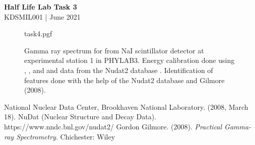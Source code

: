 \documentclass[11pt]{article}
\numberwithin{equation}{section}
\numberwithin{table}{section}
\begin{document}
\begin{center}
    {\textbf{\LARGE Half Life Lab Task 3}}\\
    \vspace{0.2in}
    KDSMIL001 | June 2021
    
\end{center}

\begin{figure}[h]
    \begin{center}
        {task4.pgf}
        \caption{Gamma ray spectrum for  from NaI scintillator detector at experimental station 1 in PHYLAB3. Energy calibration done using , , and  and data from the Nudat2 database \cite{nudat}. Identification of features done with the help of the Nudat2 database \cite{nudat} and Gilmore (2008)\cite{gilmore}.}
        \label{fig:28Al Gamma Ray Spectrum}
    \end{center}
\end{figure}

\begin{thebibliography}{9}
    National Nuclear Data Center, Brookhaven National Laboratory. (2008, March 18). NuDat (Nuclear Structure and Decay Data). https://www.nndc.bnl.gov/nudat2/
    Gordon Gilmore. (2008). \textit{Practical Gamma-ray Spectrometry}. Chichester: Wiley
\end{thebibliography}
\end{document}
